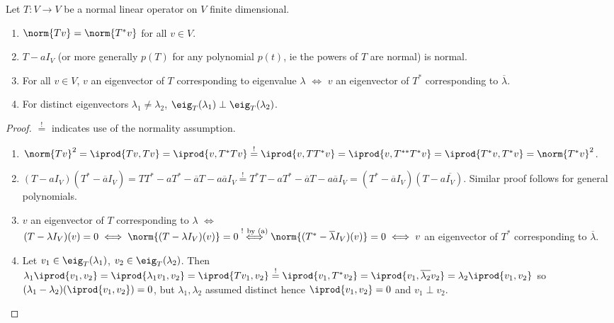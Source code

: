 \begin{proposition}\label{prop:propertiesofnormaloperators}
    Let $T : V \to V$ be a normal linear operator on $V$ finite dimensional. \begin{enumerate}[label=(\alph*)]
        \item $\norm{Tv} = \norm{T^\ast v}$ for all $v \in V$.
        \item $T - a I_V$ (or more generally $p(T)$ for any polynomial $p(t)$, ie the powers of $T$ are normal) is normal.
        \item For all $v \in V$, $v$ an eigenvector of $T$ corresponding to eigenvalue $\lambda$ $\iff$ $v$ an eigenvector of $T^\ast$ corresponding to $\overline{\lambda}$.
        \item For distinct eigenvectors $\lambda_1 \neq \lambda_2$, $\eig_T(\lambda_1) \perp \eig_T(\lambda_2)$.
    \end{enumerate}
\end{proposition}

\begin{proof}
    $\overset{!}{=}$ indicates use of the normality assumption.
    \begin{enumerate}[label=(\alph*)]
        \item $\norm{Tv}^2 = \iprod{Tv, Tv} = \iprod{v, T^\ast T v} \overset{!}{=} \iprod{v, T T^\ast v} = \iprod{v, T^{\ast \ast} T^{\ast} v} = \iprod{T^\ast v, T^\ast v} = \norm{T^\ast v}^2$.
        \item $(T - aI_V)(T^\ast - \overline{a} I_V) = T T^\ast - a T^\ast - \overline{a} T - a \overline{a}I_V \overset{!}{=} T^\ast T - aT^\ast - \overline{a}T - a \overline{a} I_V = (T^\ast - \overline{a} I_V)(T - a \overline{I_V})$. Similar proof follows for general polynomials.
        \item $v$ an eigenvector of $T$ corresponding to $\lambda$ $\iff$ $(T - \lambda I_V)(v) = 0 \iff \norm{(T-\lambda I_V)(v)} = 0 \overset{\text{! by (a)}}{\iff} \norm{(T^\ast - \overline{\lambda} I_V)(v)} =0 \iff v$ an eigenvector of $T^\ast$ corresponding to $\overline{\lambda}$.
        \item Let $v_1 \in \eig_T(\lambda_1)$, $v_2 \in \eig_T(\lambda_2)$. Then $\lambda_1 \iprod{v_1, v_2} = \iprod{\lambda_1 v_1, v_2} = \iprod{Tv_1, v_2} \overset{!}{=} \iprod{v_1, T^\ast v_2} = \iprod{v_1, \overline{\lambda_2} v_2} = \lambda_2 \iprod{v_1, v_2}$ so $(\lambda_1 - \lambda_2)(\iprod{v_1, v_2}) = 0$, but $\lambda_1, \lambda_2$ assumed distinct hence $\iprod{v_1, v_2} = 0$ and $v_1 \perp v_2$.
    \end{enumerate}
\end{proof}